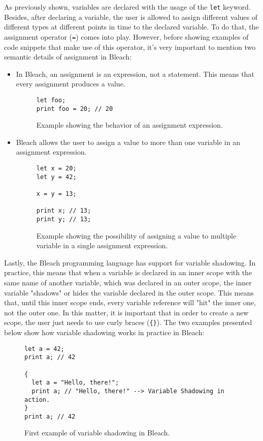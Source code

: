 As previously shown, variables are declared with the usage of the \texttt{let} keyword. Besides, after declaring a variable, the user is allowed to assign different values of different types at different points in time to the declared variable. To do that, the assignment operator (\texttt{=}) comes into play. However, before showing examples of code snippets that make use of this operator, it's very important to mention two semantic details of assignment in Bleach:
\begin{itemize}
    \item In Bleach, an assignment is an expression, not a statement. This means that every assignment produces a value.
    \begin{figure}[H]
        \centering
        \begin{lstlisting}
let foo;
print foo = 20; // 20
        \end{lstlisting}
        \caption{Example showing the behavior of an assignment expression.}
    \end{figure}
    
    \item Bleach allows the user to assign a value to more than one variable in an assignment expression.
    \begin{figure}[H]
        \centering
        \begin{lstlisting}
let x = 20;
let y = 42;

x = y = 13;

print x; // 13;
print y; // 13;
        \end{lstlisting}
        \caption{Example showing the possibility of assigning a value to multiple variable in a single assignment expression.}
    \end{figure}
\end{itemize}

Lastly, the Bleach programming language has support for variable shadowing. In practice, this means that when a variable is declared in an inner scope with the same name of another variable, which was declared in an outer scope, the inner variable "shadows" or hides the variable declared in the outer scope. This means that, until this inner scope ends, every variable reference will "hit" the inner one, not the outer one. In this matter, it is important that in order to create a new scope, the user just needs to use curly braces (\texttt{\{\}}). The two examples presented below show how variable shadowing works in practice in Bleach:
\begin{figure}[H]
    \centering
    \begin{lstlisting}
let a = 42;
print a; // 42

{
  let a = "Hello, there!";
  print a; // "Hello, there!" --> Variable Shadowing in action.
}
print a; // 42
    \end{lstlisting}
    \caption{First example of variable shadowing in Bleach.}
\end{figure}

